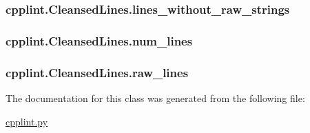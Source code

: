 \subsubsection[{\texorpdfstring{lines\+\_\+without\+\_\+raw\+\_\+strings}{lines_without_raw_strings}}]{\setlength{\rightskip}{0pt plus 5cm}cpplint.\+Cleansed\+Lines.\+lines\+\_\+without\+\_\+raw\+\_\+strings}\hypertarget{classcpplint_1_1CleansedLines_a0cc228ba3c00ba590b27a759cf8023ce}{}\label{classcpplint_1_1CleansedLines_a0cc228ba3c00ba590b27a759cf8023ce}
\subsubsection[{\texorpdfstring{num\+\_\+lines}{num_lines}}]{\setlength{\rightskip}{0pt plus 5cm}cpplint.\+Cleansed\+Lines.\+num\+\_\+lines}\hypertarget{classcpplint_1_1CleansedLines_a4b42ab48659954fb6e0a4e4eb483a45a}{}\label{classcpplint_1_1CleansedLines_a4b42ab48659954fb6e0a4e4eb483a45a}
\subsubsection[{\texorpdfstring{raw\+\_\+lines}{raw_lines}}]{\setlength{\rightskip}{0pt plus 5cm}cpplint.\+Cleansed\+Lines.\+raw\+\_\+lines}\hypertarget{classcpplint_1_1CleansedLines_a9e94ce9e4f682be33c04fe82429c4dfd}{}\label{classcpplint_1_1CleansedLines_a9e94ce9e4f682be33c04fe82429c4dfd}


The documentation for this class was generated from the following file\+:\begin{DoxyCompactItemize}
\item 
\hyperlink{cpplint_8py}{cpplint.\+py}\end{DoxyCompactItemize}
